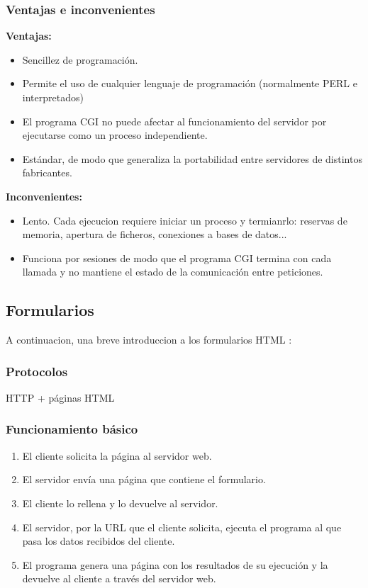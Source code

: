 \documentclass{apuntes}
\begin{document}
\subsubsection{Ventajas e inconvenientes}
\textbf{Ventajas:}
\begin{itemize}
\item Sencillez de programación.
\item Permite el uso de cualquier lenguaje de programación (normalmente PERL e interpretados)
\item El programa CGI no puede afectar al funcionamiento del servidor por ejecutarse como un proceso independiente.
\item Estándar, de modo que generaliza la portabilidad entre servidores de distintos fabricantes.
\end{itemize}
\textbf{Inconvenientes:}
\begin{itemize}
\item Lento. Cada ejecucion requiere iniciar un proceso y termianrlo: reservas de memoria, apertura de ficheros, conexiones a bases de datos...
\item Funciona por sesiones de modo que el programa CGI termina con cada llamada y no mantiene el estado de la comunicación entre peticiones.
\end{itemize}


\subsection{Formularios}
A continuacion, una breve introduccion a los formularios HTML :
\subsubsection{Protocolos}
HTTP + páginas HTML

\subsubsection{Funcionamiento básico}
\begin{enumerate}
\item El cliente solicita la página al servidor web.
\item El servidor envía una página que contiene el formulario.
\item El cliente lo rellena y lo devuelve al servidor.
\item El servidor, por la URL que el cliente solicita, ejecuta el programa al que pasa los datos recibidos del cliente.
\item El programa genera una página con los resultados de su ejecución y la devuelve al cliente a través del servidor web.
\end{enumerate}
\end{document}
